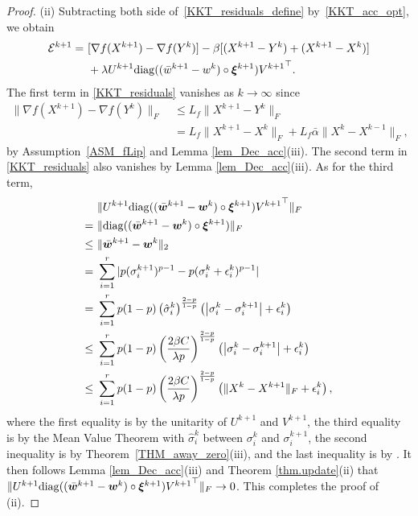 \documentclass[twoside,11pt]{article}
\numberwithin{equation}{section}
\begin{document}
\begin{proof}
(ii)  
  Subtracting both side of~\eqref{KKT_residuals_define} by~\eqref{KKT_acc_opt}, we obtain 
  \begin{equation}\label{KKT_residuals}
    \begin{aligned}
      \mathcal{E}^{k+1} 
    =&\ [\nabla{f}(X^{k+1})  - \nabla{f}(Y^{k})] - \beta [(X^{k+1}-Y^{k}) + (X^{k+1} - X^{k})] \\ 
     &\ + \lambda U^{k+1}{\rm diag}((\bar{w}^{k+1} - w^{k}) \circ\bm{\xi}^{k+1}) {V^{k+1}}^{\top}.  
    \end{aligned}
  \end{equation}
  The first term in \eqref{KKT_residuals} vanishes as $k\to \infty$ since 
  \begin{equation} \label{ineq_acc_nabdaF}
    \begin{aligned}
      \|\nabla f(X^{k+1}) - \nabla f (Y^{k})\|_{F} 
      &\ \le L_{f}\|X^{k+1}-Y^{k}\|_{F} \\
      &\ = L_{f} \|X^{k+1}-X^{k}\|_{F} + L_{f}\bar{\alpha}\|X^{k}-X^{k-1}\|_{F},
    \end{aligned}
  \end{equation}
  by Assumption~\ref{ASM_fLip} and Lemma \ref{lem_Dec_acc}(iii). 
  The second term in \eqref{KKT_residuals} also vanishes by Lemma \ref{lem_Dec_acc}(iii).  
  As for the third term,  
  \begin{equation}\label{eq.usv}
    \begin{aligned} 
      &\ \|   U^{k+1}{\rm diag}((\bar{\bm w}^{k+1} - \bm{w}^{k}) \circ\bm{\xi}^{k+1}) {V^{k+1}}^{\top}\|_F\\
    = &\  \| {\rm diag}((\bar{\bm w}^{k+1} - \bm{w}^{k}) \circ\bm{\xi}^{k+1})  \|_F \\
   \le&\ \|  \bar{\bm w}^{k+1} - \bm{w}^{k}   \|_2 \\ 
    = &\ \sum_{i=1}^r | p(\sigma_i^{k+1})^{p-1} - p(\sigma_i^k+\epsilon_i^k)^{p-1} |\\
    = &\ \sum\limits_{i=1}^{r}p (1-p) \left( \hat{\sigma}_i^k \right)^{\frac{2-p}{1-p}}  \left(\left|\sigma_i^k-\sigma_i^{k+1} \right| + \epsilon_{i}^{k} \right) \\
   \le&\ \sum\limits_{i=1}^{r}p (1-p) \left(\frac{2\beta C}{\lambda p}\right)^{\frac{2-p}{1-p}}  \left(\left|\sigma_i^k-\sigma_i^{k+1} \right| + \epsilon_{i}^{k} \right)\\
   \le&\ \sum\limits_{i=1}^{r}p (1-p) \left(\frac{2\beta C}{\lambda p}\right)^{\frac{2-p}{1-p}}  \left(\| X^k-X^{k+1} \|_F + \epsilon_{i}^{k} \right), 
    \end{aligned} 
  \end{equation} 
  where the first equality is by the unitarity of $U^{k+1}$ and $V^{k+1}$, the third equality 
  is by the Mean Value Theorem with  $\hat{\sigma}_i^k $ between $\sigma^k_i$ and 
  $\sigma_i^{k+1}$, the second inequality is by  Theorem~\ref{THM_away_zero}(iii), and 
  the last inequality is by \cite[Problem 7.3.P16]{horn2012matrix}.  
  It then follows Lemma \ref{lem_Dec_acc}(iii) and Theorem \ref{thm.update}(ii) that 
$\| U^{k+1}{\rm diag}((\bar{\bm w}^{k+1} - \bm{w}^{k}) \circ\bm{\xi}^{k+1}) {V^{k+1}}^{\top}\|_F \to 0$. 
This completes the proof of (ii). 
 \end{proof}
\end{document}
